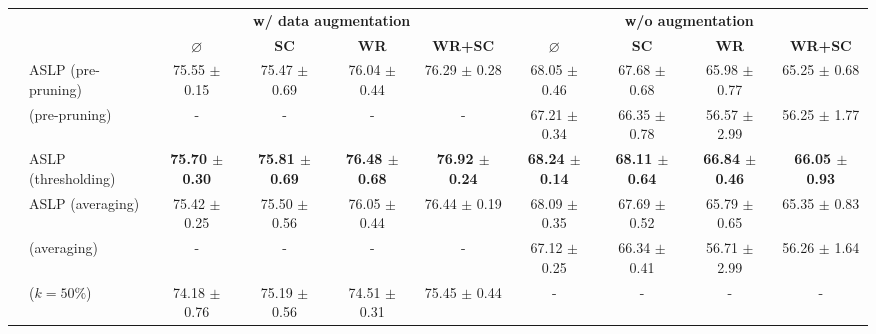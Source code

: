 \begin{table}
  \centering
  \resizebox{16.5cm}{!} {
    \begin{tabular}{llcccccccc}
      \cmidrule[\heavyrulewidth]{3-10}
        &  & \multicolumn{4}{c}{\textbf{w/ data augmentation}} & \multicolumn{4}{c}{\textbf{w/o augmentation}} \\
       &  &  $\varnothing$ & \textbf{SC} & \textbf{WR} & \textbf{WR+SC} & $\varnothing$ & \textbf{SC} & \textbf{WR} & \textbf{WR+SC} \\
      \toprule

      \multirow{18}{*}{} \multirow{6}{*}{\textbf{Conv2}} & ASLP (pre-pruning) & 75.55 $\pm$ 0.15 & 75.47 $\pm$ 0.69 & 76.04 $\pm$ 0.44 & 76.29 $\pm$ 0.28 & 68.05 $\pm$ 0.46 & 67.68 $\pm$ 0.68 & 65.98 $\pm$ 0.77 & 65.25 $\pm$ 0.68 \\
        & \cite{DBLP:conf/nips/ZhouLLY19} (pre-pruning) & - & - & - & - & 67.21 $\pm$ 0.34 & 66.35 $\pm$ 0.78 & 56.57 $\pm$ 2.99 & 56.25 $\pm$ 1.77 \\
      \cmidrule(lr){2-10}
        & ASLP (thresholding) & \textbf{75.70 $\pm$ 0.30} & \textbf{75.81 $\pm$ 0.69} & \textbf{76.48 $\pm$ 0.68} & \textbf{76.92 $\pm$ 0.24} & \textbf{68.24 $\pm$ 0.14} &\textbf{ 68.11 $\pm$ 0.64} & \textbf{66.84 $\pm$ 0.46} & \textbf{66.05 $\pm$ 0.93} \\
        & ASLP (averaging)& 75.42 $\pm$ 0.25 & 75.50 $\pm$ 0.56 & 76.05 $\pm$ 0.44 & 76.44 $\pm$ 0.19 & 68.09 $\pm$ 0.35 & 67.69 $\pm$ 0.52 & 65.79 $\pm$ 0.65 & 65.35 $\pm$ 0.83 \\
        & \cite{DBLP:conf/nips/ZhouLLY19} (averaging)& - & - & - & - & 67.12 $\pm$ 0.25 & 66.34 $\pm$ 0.41 & 56.71 $\pm$ 2.99 & 56.26 $\pm$ 1.64 \\
        & \cite{DBLP:conf/cvpr/RamanujanWKFR20} ($k=50\%$) & 74.18 $\pm$ 0.76 & 75.19 $\pm$ 0.56 & 74.51 $\pm$ 0.31 & 75.45 $\pm$ 0.44 & - & - & - & - \\
      \midrule


\end{tabular}}
\end{table}
